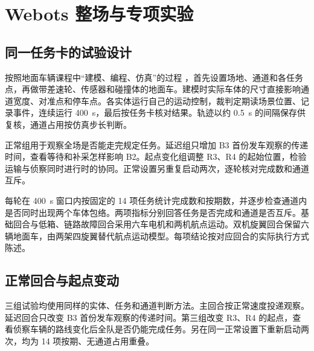 \clearpage

\section{Webots 整场与专项实验}\label{sec:4}

\subsection{同一任务卡的试验设计}\label{sec:4.1}

按照地面车辆课程中“建模、编程、仿真”的过程 \cite{ref2,ref5,ref19}，首先设置场地、通道和各任务点，再做带差速轮、传感器和碰撞体的地面车。建模时实际车体的尺寸直接影响通道宽度、对准点和停车点。各实体运行自己的运动控制，裁判定期读场景位置、记录事件，连续运行 400~s，最后按任务卡核对结果。轨迹以约 0.5~s 的间隔保存供复核，通道占用按仿真步长判断。

正常组用于观察全场是否能走完规定任务。延迟组只增加 B3 首份发车观察的传递时间，查看等待和补采怎样影响 B2。起点变化组调整 R3、R4 的起始位置，检验运输与侦察同时进行时的协同。正常设置另重复启动两次，逐轮核对完成数和通道互斥。

每轮在 400~s 窗口内按固定的 14 项任务统计完成数和按期数，并逐步检查通道内是否同时出现两个车体包络。两项指标分别回答任务是否完成和通道是否互斥。基础回合与低箱、链路故障回合采用六车电机和两机航点运动。双机旋翼回合保留六辆地面车，由两架四旋翼替代航点运动模型。每项结论按对应回合的实际执行方式陈述。

\subsection{正常回合与起点变动}\label{sec:4.2}

三组试验均使用同样的实体、任务和通道判断方法。主回合按正常速度投递观察。延迟回合只改变 B3 首份发车观察的传递时间。第三组改变 R3、R4 的起点，查看侦察车辆的路线变化后全队是否仍能完成任务。另在同一正常设置下重新启动两次，均为 14 项按期、无通道占用重叠。

